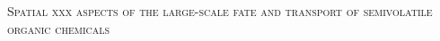 \documentclass[a5paper, 12pt]{article}
\begin{document}
\LARGE
\pagestyle{empty}

\begin{center}
\textsc{Spatial xxx  aspects of the large-scale fate and transport of semivolatile organic chemicals}
\end{center}
\end{document}
